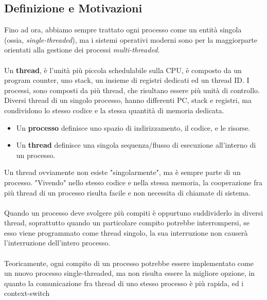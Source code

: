 \documentclass[12pt, letterpaper]{article}
\newcommand{\acc}{\\\hphantom{}\\}
\begin{document}
\subsection{Definizione e Motivazioni}
Fino ad ora, abbiamo sempre trattato ogni processo come un entità singola (ossia, \textit{single-threaded}), ma 
i sistemi operativi moderni sono per la maggiorparte orientati alla gestione dei processi \textit{multi-threaded}.\acc 
Un \textbf{thread}, è l'unità più piccola schedulabile sulla CPU, è composto da un program counter, uno stack, un insieme 
di registri dedicati ed un thread ID. I processi, sono composti da più thread, che risultano essere più unità di controllo.
Diversi thread di un singolo processo, hanno differenti PC, stack e registri, ma condividono lo stesso codice e la 
stessa quantità di memoria dedicata. \begin{itemize}
    \item Un \textbf{processo} definisce uno spazio di indirizzamento, il codice, e le risorse.
    \item Un \textbf{thread} definisce una singola sequenza/flusso di esecuzione all'interno di un processo.
\end{itemize}
\begin{figure}[h]
\end{figure}Un thread ovviamente non esiste "singolarmente", ma è sempre parte di un processo. "Vivendo" nello stesso codice e 
nella stessa memoria, la cooperazione fra più thread di un processo risulta facile e non necessita di chiamate di sistema.\acc 
Quando un processo deve svolgere più compiti è oppurtuno suddividerlo in diversi thread, soprattutto quando un particolare 
compito potrebbe interrompersi, se esso viene programmato come thread singolo, la sua interruzione non causerà 
l'interruzione dell'intero processo.\acc 
Teoricamente, ogni compito di un processo potrebbe essere implementato come un nuovo processo single-threaded, ma non 
risulta essere la migliore opzione, in quanto la comunicazione fra thread di uno stesso processo è più rapida, ed i context-switch 
\end{document}
